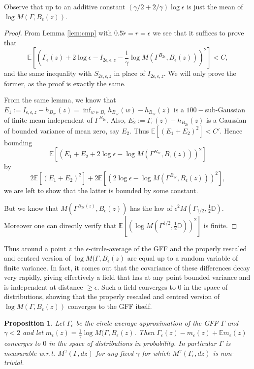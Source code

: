 \documentclass[11pt]{amsart}
\newtheorem{prop}[thm]{Proposition}
\newcommand{\D}{\mathbb D}
\newcommand{\E}{\mathbb E}
\renewcommand{\1}{\mathbf 1}
\newcommand{\eps}{\epsilon}
\begin{document}
Observe that up to an additive constant $(\gamma/2 + 2/\gamma)\log \eps$ is just the mean of $\log M(\Gamma, B_{\eps}(z))$. 

\begin{proof}
From Lemma \ref{lem:cmp} with $0.5\tilde r = r = \eps$ we see that it suffices to prove that 
$$\E\left[\left(\Gamma_\eps(z) + 2\log \eps - I_{2\eps,\eps,z} - \frac{1}{\gamma} \log M(\Gamma^{B_{2\eps}}, B_{\eps}(z)) \right)^2\right] < C,$$
and the same inequality with $S_{2\eps,\eps,z}$ in place of $I_{2\eps,\eps,z}$. We will only prove the former, as the proof is exactly the same.

From the same lemma, we know that $E_1 := I_{\eps,\eps,z} - h_{B_{2\eps}}(z) = \inf_{w \in B_\eps} h_{B_{2\eps}}(w) - h_{B_{2\eps}}(z)$ is a $100-$sub-Gaussian of finite mean independent of $\Gamma^{B_{2\eps}}$. Also, $E_2 := \Gamma_\eps(z) - h_{B_{2\eps}}(z)$ is a Gaussian of bounded variance of mean zero, say $E_2$. Thus
$ \E\left[(E_1 + E_2)^2\right] < C'.$
Hence bounding 
$$\E\left[\left(E_1 + E_2 + 2\log \eps - \log  M(\Gamma^{B_{2\eps}}, B_{\eps}(z)) \right)^2\right]$$
by
$$2\E\left[(E_1 + E_2)^2\right] + 2\E\left[\left(2\log \eps - \log  M(\Gamma^{B_{2\eps}}, B_{\eps}(z)) \right)^2\right],$$ we are left to show that the latter is bounded by some constant.

But we know that $M(\Gamma^{B_{2\eps}(z)}, B_{\eps}(z))$ has the law of $\eps^2 M(\Gamma_{1/2},\frac{1}{2}\D)$. Moreover one can directly verify that $\E\left[\left(\log M(\Gamma^{1/2},\frac{1}{2}\D)\right)^2\right]$ is finite.
\end{proof}

Thus around a point $z$ the $\eps$-circle-average of the GFF and the properly rescaled and centred version of $\log M(\Gamma, B_{\eps}(z)$ are equal up to a random variable of finite variance. In fact, it comes out that the covariance of these differences decay very rapidly, giving effectively a field that has at any point bounded variance and is independent at distance $\geq \eps$. Such a field converges to $0$ in the space of distributions, showing that the properly rescaled and centred version of $\log M(\Gamma, B_{\eps}(z))$ converges to the GFF itself.
\begin{prop}\label{prop:mes}
Let $\Gamma_\eps$ be the circle average approximation of the GFF $\Gamma$ and $\gamma < 2$ and let $m_\eps(z) = \frac{1}{\gamma}\log M(\Gamma, B_{\eps}(z)$. Then $\Gamma_\eps(z) - m_\eps(z) + \E m_\eps(z)$ converges to $0$ in the space of distributions in probability. In particular $\Gamma$ is measurable w.r.t. $M^\gamma(\Gamma,dz)$ for any fixed $\gamma$ for which $M^\gamma(\Gamma_\eps,dz)$ is non-trivial.
\end{prop}
\end{document}

